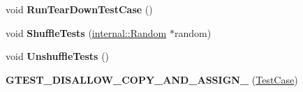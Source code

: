 \begin{DoxyCompactItemize}
void {\bfseries Run\+Tear\+Down\+Test\+Case} ()
\item 
\mbox{\label{classtesting_1_1_test_case_ac26160e2aeb3d8c86b611843c5abdb29}} 
void {\bfseries Shuffle\+Tests} (\mbox{\hyperlink{classtesting_1_1internal_1_1_random}{internal\+::\+Random}} $\ast$random)
\item 
\mbox{\label{classtesting_1_1_test_case_ad54a66cd65b4420c960d6db79b7cadf6}} 
void {\bfseries Unshuffle\+Tests} ()
\item 
\mbox{\label{classtesting_1_1_test_case_a00a4ea337b43015c71874ece0de58db7}} 
{\bfseries G\+T\+E\+S\+T\+\_\+\+D\+I\+S\+A\+L\+L\+O\+W\+\_\+\+C\+O\+P\+Y\+\_\+\+A\+N\+D\+\_\+\+A\+S\+S\+I\+G\+N\+\_\+} (\mbox{\hyperlink{classtesting_1_1_test_case}{Test\+Case}})
\end{DoxyCompactItemize}

